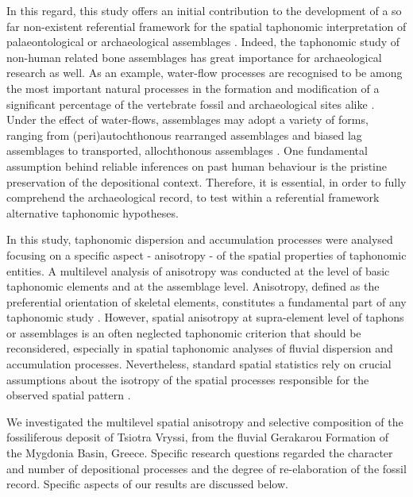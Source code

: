 \documentclass[5p,times,authoryear]{elsarticle}
\begin{document}
In this regard, this study offers an initial contribution to the development of a so far non-existent referential framework for the spatial taphonomic interpretation of palaeontological or archaeological assemblages \citep{Dominguez-Rodrigo2017}. Indeed, the taphonomic study of non-human related bone assemblages has great importance for archaeological research as well. As an example, water-flow processes are recognised to be among the most important natural processes in the formation and modification of a significant percentage of the vertebrate fossil and archaeological sites alike \citep[][among others]{Behrensmeyer1975,Behrensmeyer1982,Behrensmeyer1988,Coard1995,Coard1999,Petraglia1987,Petraglia1994,Schiffer1987,Voorhies1969}. Under the effect of water-flows, assemblages may adopt a variety of forms, ranging from (peri)autochthonous rearranged assemblages and biased lag assemblages to transported, allochthonous assemblages \citep{Behrensmeyer1988,Dominguez-Rodrigo2013}. One fundamental assumption behind reliable inferences on past human behaviour is the pristine preservation of the depositional context. Therefore, it is essential, in order to fully comprehend the archaeological record, to test within a referential framework alternative taphonomic hypotheses.

In this study, taphonomic dispersion and accumulation processes were analysed focusing on a specific aspect - anisotropy - of the spatial properties of taphonomic entities. A multilevel analysis of anisotropy was conducted at the level of basic taphonomic elements and at the assemblage level. Anisotropy, defined as the preferential orientation of skeletal elements, constitutes a fundamental part of any taphonomic study \citep[][among others]{Toots1965,Voorhies1969,Nash1987,Schick1987a,Petraglia1987,Petraglia1994,Fiorillo1991,Benito-Calvo2011,Torre2013a,Dominguez-Rodrigo2012,Dominguez-Rodrigo2014,Dominguez-Rodrigo2014c,Cobo-Sanchez2014,Aramendi2017,Organista2017}. However, spatial anisotropy at supra-element level of taphons or assemblages is an often neglected taphonomic criterion that should be reconsidered, especially in spatial taphonomic analyses of fluvial dispersion and accumulation processes. Nevertheless, standard spatial statistics rely on crucial assumptions about the isotropy of the spatial processes responsible for the observed spatial pattern \citep{spatstatBook}.

We investigated the multilevel spatial anisotropy and selective composition of the fossiliferous deposit of Tsiotra Vryssi, from the fluvial Gerakarou Formation of the Mygdonia Basin, Greece. Specific research questions regarded the character and number of depositional processes and the degree of re-elaboration of the fossil record. Specific aspects of our results are discussed below.
\end{document}

